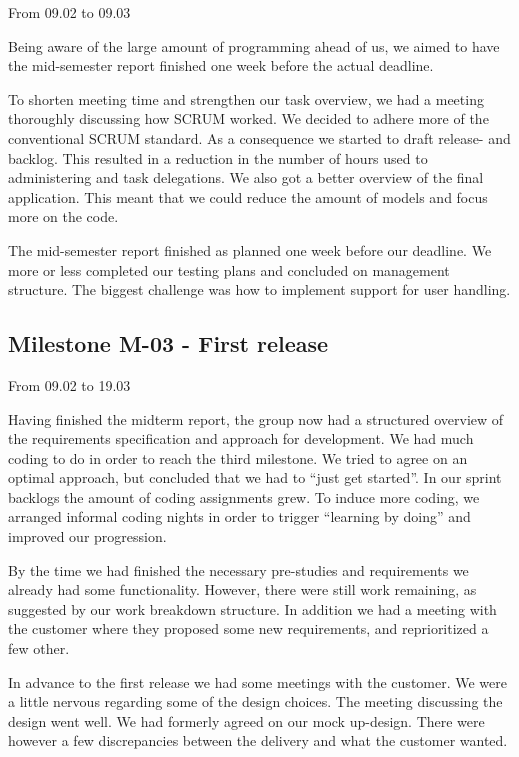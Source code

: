 From 09.02 to 09.03

Being aware of the large amount of programming ahead of us, we aimed to
have the mid-semester report finished one week before the actual
deadline.


\bigskip

To shorten meeting time and strengthen our task overview, we had a
meeting thoroughly discussing how SCRUM worked. We decided to adhere
more of the conventional SCRUM standard. As a consequence we started to
draft release- and backlog. This resulted in a reduction in the number
of hours used to administering and task delegations. We also got a
better overview of the final application. This meant that we could
reduce the amount of models and focus more on the code. 


\bigskip

The mid-semester report finished as planned one week before our
deadline. We more or less completed our testing plans and concluded on
management structure. The biggest challenge was how to implement
support for user handling. 


\bigskip

\subsection{Milestone M-03 - First release}

From 09.02 to 19.03

Having finished the midterm report, the group now had a structured
overview of the requirements specification and approach for
development. We had much coding to do in order to reach the third
milestone. We tried to agree on an optimal approach, but concluded that
we had to {\textquotedblleft}just get started{\textquotedblright}. In
our sprint backlogs the amount of coding assignments grew. To induce
more coding, we arranged informal coding nights in order to trigger
{\textquotedblleft}learning by doing{\textquotedblright} and improved
our progression.


\bigskip

By the time we had finished the necessary pre-studies and requirements
we already had some functionality. However, there were still work
remaining, as suggested by our work breakdown structure. In addition we
had a meeting with the customer where they proposed some new
requirements, and reprioritized a few other. 


\bigskip

In advance to the first release we had some meetings with the customer.
We were a little nervous regarding some of the design choices. The
meeting discussing the design went well. We had formerly agreed on our
mock up-design. There were however a few discrepancies between the
delivery and what the customer wanted. \ 


